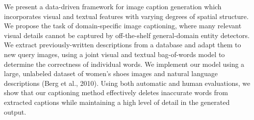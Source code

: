 We present a data-driven framework for image caption generation which incorporates visual and textual features with varying degrees of spatial structure. We propose the task of domain-specific image captioning, where many relevant visual details cannot be captured by off-the-shelf general-domain entity detectors. We extract previously-written descriptions from a database and adapt them to new query images, using a joint visual and textual bag-of-words model to determine the correctness of individual words. We implement our model using a large, unlabeled dataset of women's shoes images and natural language descriptions (Berg et al., 2010). Using both automatic and human evaluations, we show that our captioning method effectively deletes inaccurate words from extracted captions while maintaining a high level of detail in the generated output.
